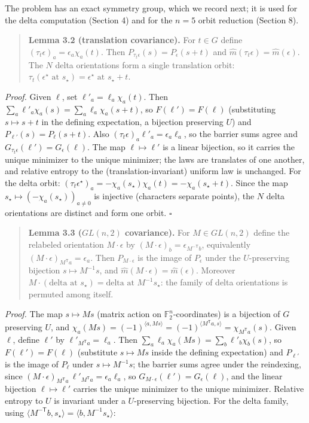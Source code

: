 \documentclass[11pt]{article}
\begin{document}
The problem has an exact symmetry group, which we record next; it is used for the delta computation (Section 4) and for the $n = 5$ orbit reduction (Section 8).

\begin{quote}
\textbf{Lemma 3.2 (translation covariance).}  For $t \in G$ define $(\tau_t\epsilon)_a = \epsilon_a\chi_a(t)$.  Then $P_{\tau_t\epsilon}(s) = P_\epsilon(s + t)$ and $\widehat m(\tau_t\epsilon) = \widehat m(\epsilon)$.  The $N$ delta orientations form a single translation orbit: $\tau_t(\epsilon^\star\text{ at }s_\star) = \epsilon^\star\text{ at } s_\star + t$.
\end{quote}
\emph{Proof.}  Given $\ell$, set $\ell'_a = \ell_a \chi_a(t)$.  Then $\sum_a \ell'_a \chi_a(s) = \sum_a \ell_a \chi_a(s+t)$, so $F(\ell') = F(\ell)$ (substituting $s \mapsto s + t$ in the defining expectation, a bijection preserving $U$) and $P_{\ell'}(s) = P_\ell(s+t)$.  Also $(\tau_t\epsilon)_a \ell'_a = \epsilon_a\ell_a$, so the barrier sums agree and $G_{\tau_t\epsilon}(\ell') = G_\epsilon(\ell)$.  The map $\ell \mapsto \ell'$ is a linear bijection, so it carries the unique minimizer to the unique minimizer; the laws are translates of one another, and relative entropy to the (translation-invariant) uniform law is unchanged.  For the delta orbit: $(\tau_t \epsilon^\star)_a = -\chi_a(s_\star)\chi_a(t) = -\chi_a(s_\star + t)$.  Since the map $s_\star \mapsto (-\chi_a(s_\star))_{a\ne0}$ is injective (characters separate points), the $N$ delta orientations are distinct and form one orbit.  $\square$

\begin{quote}
\textbf{Lemma 3.3 ($GL(n,2)$ covariance).}  For $M \in GL(n,2)$ define the relabeled orientation $M\cdot\epsilon$ by $(M\cdot\epsilon)_b = \epsilon_{M^{-\mathsf T} b}$, equivalently $(M\cdot\epsilon)_{M^{\mathsf T} a} = \epsilon_a$.  Then $P_{M\cdot\epsilon}$ is the image of $P_\epsilon$ under the $U$-preserving bijection $s \mapsto M^{-1}s$, and $\widehat m(M\cdot\epsilon) = \widehat m(\epsilon)$.  Moreover $M\cdot(\text{delta at } s_\star) = \text{delta at } M^{-1}s_\star$: the family of delta orientations is permuted among itself.
\end{quote}
\emph{Proof.}  The map $s \mapsto Ms$ (matrix action on $\mathbb{F}_2^n$-coordinates) is a bijection of $G$ preserving $U$, and $\chi_a(Ms) = (-1)^{\langle a, Ms\rangle} = (-1)^{\langle M^{\mathsf T} a, s\rangle} = \chi_{M^{\mathsf T}a}(s)$. Given $\ell$, define $\ell'$ by $\ell'_{M^{\mathsf T}a} = \ell_a$. Then $\sum_a \ell_a \chi_a(Ms) = \sum_b \ell'_b \chi_b(s)$, so $F(\ell') = F(\ell)$ (substitute $s \mapsto Ms$ inside the defining expectation) and $P_{\ell'}$ is the image of $P_\ell$ under $s \mapsto M^{-1}s$; the barrier sums agree under the reindexing, since $(M\cdot\epsilon)_{M^{\mathsf T}a}\,\ell'_{M^{\mathsf T}a} = \epsilon_a \ell_a$, so $G_{M\cdot\epsilon}(\ell') = G_\epsilon(\ell)$, and the linear bijection $\ell \mapsto \ell'$ carries the unique minimizer to the unique minimizer.  Relative entropy to $U$ is invariant under a $U$-preserving bijection.  For the delta family, using $\langle M^{-\mathsf T}b, s_\star\rangle = \langle b, M^{-1}s_\star\rangle$:
\end{document}
